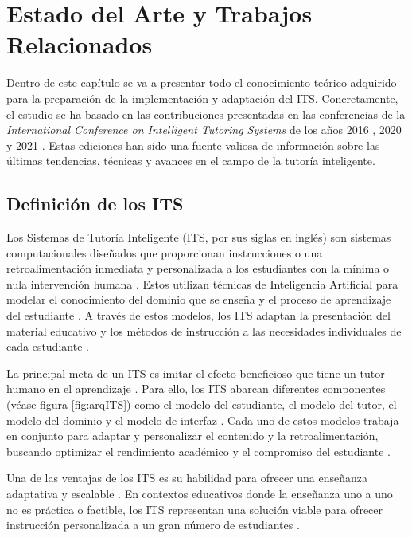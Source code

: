 \chapter{Estado del Arte y Trabajos Relacionados} \label{chap:stateoftheart}

Dentro de este capítulo se va a presentar todo el conocimiento teórico adquirido para la preparación de la implementación y adaptación del ITS. Concretamente, el estudio se ha basado en las contribuciones presentadas en las conferencias de la \textit{International Conference on Intelligent Tutoring Systems} de los años 2016 \cite{ITS2016}, 2020 \cite{ITS2020} y 2021 \cite{ITS2021}. Estas ediciones han sido una fuente valiosa de información sobre las últimas tendencias, técnicas y avances en el campo de la tutoría inteligente. 

\section{Definición de los ITS}

Los Sistemas de Tutoría Inteligente (ITS, por sus siglas en inglés) son sistemas computacionales diseñados que proporcionan instrucciones o una retroalimentación inmediata y personalizada a los estudiantes con la mínima o nula intervención humana \cite{Woolf2009}. Estos utilizan técnicas de Inteligencia Artificial para modelar el conocimiento del dominio que se enseña y el proceso de aprendizaje del estudiante \cite{Aleven2016}. A través de estos modelos, los ITS adaptan la presentación del material educativo y los métodos de instrucción a las necesidades individuales de cada estudiante \cite{Nwana1990}.

La principal meta de un ITS es imitar el efecto beneficioso que tiene un tutor humano en el aprendizaje \cite{VanLehn2011}. Para ello, los ITS abarcan diferentes componentes (véase figura \ref{fig:arqITS}) como el modelo del estudiante, el modelo del tutor, el modelo del dominio y el modelo de interfaz \cite{Koedinger1997}. Cada uno de estos modelos trabaja en conjunto para adaptar y personalizar el contenido y la retroalimentación, buscando optimizar el rendimiento académico y el compromiso del estudiante \cite{Durlach2008}.

Una de las ventajas de los ITS es su habilidad para ofrecer una enseñanza adaptativa y escalable \cite{Murray2003}. En contextos educativos donde la enseñanza uno a uno no es práctica o factible, los ITS representan una solución viable para ofrecer instrucción personalizada a un gran número de estudiantes \cite{Graesser2009}.

